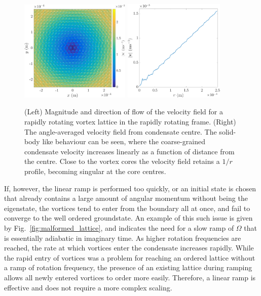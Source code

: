 \begin{figure}\centering
    \includegraphics[width=0.47\textwidth,clip,trim={0cm 0cm 0 0cm}]{Images/ch4_vtx/solidbody_v}
    \includegraphics[width=0.43\textwidth,clip,trim={0cm 0cm 0 0cm}]{Images/ch4_vtx/solidbody_vel_r}
    \caption{(Left) Magnitude and direction of flow of the velocity field for a rapidly rotating vortex lattice in the rapidly rotating frame. (Right) The angle-averaged velocity field from condensate centre. The solid-body like behaviour can be seen, where the coarse-grained condensate velocity increases linearly as a function of distance from the centre. Close to the vortex cores the velocity field retains a $1/r$ profile, becoming singular at the core centres.}
    \label{fig:solidbody}
\end{figure}

If, however, the linear ramp is performed too quickly, or an initial state is chosen that already contains a large amount of angular momentum without being the eigenstate, the vortices tend to enter from the boundary all at once, and fail to converge to the well ordered groundstate. An example of this such issue is given by Fig.~\ref{fig:malformed_lattice}, and indicates the need for a slow ramp of $\Omega$ that is essentially adiabatic in imaginary time. As higher rotation frequencies are reached, the rate at which vortices enter the condensate increases rapidly. While the rapid entry of vortices was a problem for reaching an ordered lattice without a ramp of rotation frequency, the presence of an existing lattice during ramping allows all newly entered vortices to order more easily. Therefore, a linear ramp is effective and does not require a more complex scaling.

